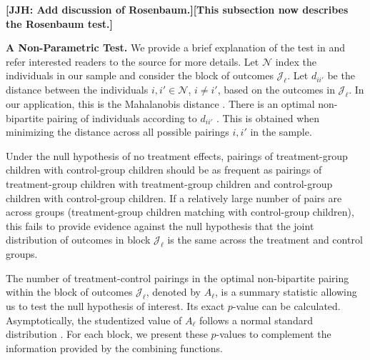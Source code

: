 \textbf{[JJH: Add discussion of Rosenbaum.][This subsection now describes the Rosenbaum test.]}

\textbf{A Non-Parametric Test.} We provide a brief explanation of the test in \citet{Rosenbaum_2005_Distribution_JRSS} and refer interested readers to the source for more details. Let $\mathcal{N}$ index the individuals in our sample and consider the block of outcomes $\mathcal{J}_\ell$. Let $d_{ii'}$ be the distance between the individuals $i, i' \in \mathcal{N}$, $i \neq i'$, based on the outcomes in $\mathcal{J}_\ell$. In our application, this is the Mahalanobis distance \citep{Mahalanobis_1936_PNISI}. There is an optimal non-bipartite pairing of individuals according to $d_{ii'}$ \citep{Derigs_1988_Solving_AOR}. This is obtained when minimizing the distance across all possible pairings $i, i'$ in the sample. 

Under the null hypothesis of no treatment effects, pairings of treatment-group children with control-group children should be as frequent as pairings of treatment-group children with treatment-group children and control-group children with control-group children. If a relatively large number of pairs are across groups (treatment-group children matching with control-group children), this fails to provide evidence against the null hypothesis that the joint distribution of outcomes in block $\mathcal{J}_\ell$ is the same across the treatment and control groups.

The number of treatment-control pairings in the optimal non-bipartite pairing within the block of outcomes $\mathcal{J}_\ell$, denoted by $A_\ell$, is a summary statistic allowing us to test the null hypothesis of interest. Its exact $p$-value can be calculated. Asymptotically, the studentized value of $A_\ell$ follows a normal standard distribution \citep{Rosenbaum_2005_Distribution_JRSS}. For each block, we present these $p$-values to complement the information provided by the combining functions.
